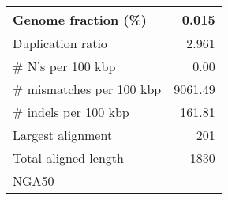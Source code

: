 \documentclass[12pt,a4paper]{article}
\begin{document}
\begin{table}[ht]
\begin{center}
\begin{tabular}{|l*{1}{|r}|}
Genome fraction (\%) & 0.015 \\ \hline
Duplication ratio & 2.961 \\ \hline
\# N's per 100 kbp & 0.00 \\ \hline
\# mismatches per 100 kbp & 9061.49 \\ \hline
\# indels per 100 kbp & 161.81 \\ \hline
Largest alignment & 201 \\ \hline
Total aligned length & 1830 \\ \hline
NGA50 & - \\ \hline
\end{tabular}
\end{center}
\end{table}
\end{document}
